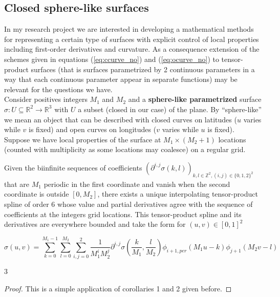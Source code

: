 \documentclass[a4paper, 11pt]{article}
\begin{document}
\subsection{Closed sphere-like surfaces}

In my research project we are interested in developing a mathematical methods for representing a certain type of 
surfaces with explicit control of local properties including first-order derivatives and curvature. As a consequence 
extension of the schemes given in equations (\ref{eq:ccurve_no}) and (\ref{eq:ocurve_no}) to tensor-product surfaces 
(that is surfaces parametrized by 2 continuous parameters in a way that each continuous parameter appear in separate 
functions) may be relevant for the questions we have. \\ 

Consider positives integers $M_1$ and $M_2$ and a \textbf{sphere-like parametrized} surface $\sigma: U \subseteq 
\mathbb{R}^2 \to \mathbb{R}^3$ with $U$ a subset (closed in our case) of the plane. By “sphere-like” we mean an object 
that can be described with closed curves on latitudes ($u$ varies while $v$ is fixed) and open curves on longitudes ($v$ 
varies while $u$ is fixed). Suppose we have local properties of the surface at $M_1\times(M_2+1)$ locations (counted 
with multiplicity as some locations may coalesce) on a regular grid. \\ 

\begin{cor}{3}
  Given the biinfinite sequences of coefficients $(\partial^{i,j}\sigma(k,l))_{k, l \in \mathbb{Z}^2, (i,j) \in 
  \{0,1,2\}^2}$ that are $M_1$ periodic in the first coordinate and vanish when the second coordinate is outside $[0, 
  M_2]$, there exists a unique interpolating tensor-product spline of order $6$ whose value and partial derivatives 
  agree with the sequence of coefficients at the integers grid locations. This tensor-product spline and its derivatives 
  are everywhere bounded and take the form for $(u,v) \in [0,1]^2$

  \begin{equation}
    \sigma(u,v) = \sum_{k=0}^{M_1-1} \sum_{l=0}^{M_2} \sum_{i,j = 0}^2 \frac{1}{M_1^i M_2^j} \partial^{i,j}
    \sigma(\frac{k}{M_1}, \frac{l}{M_2}) \phi_{i+1, per}(M_1u-k) \phi_{j+1}(M_2v-l)
  \end{equation}
\end{cor}{3}

\begin{proof}
  This is a simple application of corollaries 1 and 2 given before.
\end{proof}
\end{document}
